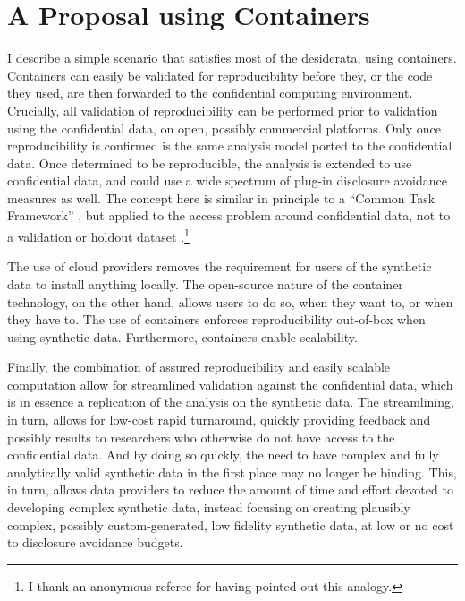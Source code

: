 \documentclass[inline]{hdsr}
\begin{document}
\section{A Proposal using Containers}
\label{sec:proposal}
I describe a simple scenario that satisfies most of the desiderata,  using containers.  Containers can easily be validated for reproducibility before they, or the code they used, are then forwarded to the confidential computing environment. Crucially, all validation of reproducibility can be performed prior to validation using the confidential data, on open, possibly commercial platforms. Only once reproducibility is confirmed is the same analysis model ported to the confidential data. Once determined to be reproducible, the analysis is extended to use confidential data, and could use a wide spectrum of plug-in disclosure avoidance measures as well. The concept here is similar in principle to a ``Common Task Framework'' \citep{liberman_obituary_2010,liberman_reproducible_2014,liu_successes_2019}, but applied to the access problem around confidential data, not to a validation or holdout dataset \citep{liu_successes_2019,donoho_data_2024}.\footnote{I thank an anonymous referee for having pointed out this analogy.}  

The use of cloud providers removes the requirement for users of the synthetic data to install anything locally. The open-source nature of the container technology, on the other hand, allows users to do so, when they want to, or when they have to. The use of containers enforces reproducibility out-of-box when using synthetic data. Furthermore, containers enable scalability. 

Finally, the combination of assured reproducibility and easily scalable computation allow for streamlined validation against the confidential data, which is in essence a replication of the analysis on the synthetic data. The streamlining, in turn, allows for low-cost rapid turnaround, quickly providing feedback and possibly results to researchers who otherwise do not have access to the confidential data. And by doing so quickly, the need to have complex and fully analytically valid synthetic data in the first place may no longer be binding. This, in turn, allows data providers to reduce the amount of time and effort devoted to developing complex synthetic data, instead focusing on creating plausibly complex, possibly custom-generated, low fidelity synthetic data, at low or no cost to disclosure avoidance budgets.
\end{document}
